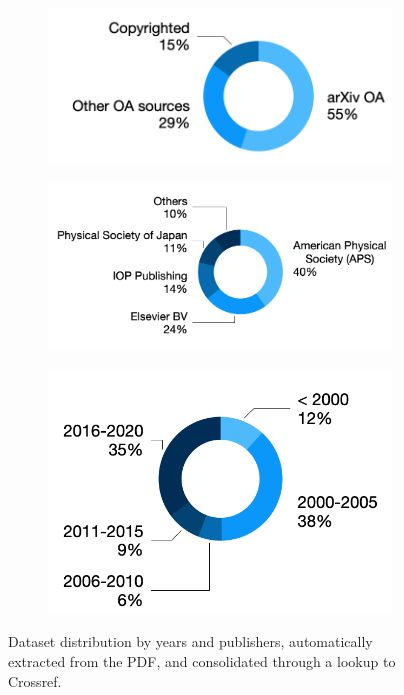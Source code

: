 \documentclass[fleqn,10pt]{wlscirep}
\begin{document}
\begin{figure}[ht]
\begin{subfigure}{0.3\textwidth}
     \centering
    \includegraphics[width=\linewidth]{papers-by-sources.png}
    \label{fig:arxiv-rate}
\end{subfigure}
\begin{subfigure}{0.4\textwidth}
     \centering
    \includegraphics[width=\linewidth]{papers-by-publishers.png}
    \label{fig:distribution-by-publisher}
\end{subfigure}
\begin{subfigure}{0.3\textwidth}
\centering
    \includegraphics[width=\linewidth]{papers-by-years.png}
    \label{fig:distribution-by-year}
\end{subfigure}
\caption{Dataset distribution by years and publishers, automatically extracted from the PDF, and consolidated through a lookup to Crossref. }
\label{fig:dataset-distributions}
\end{figure}
\end{document}
